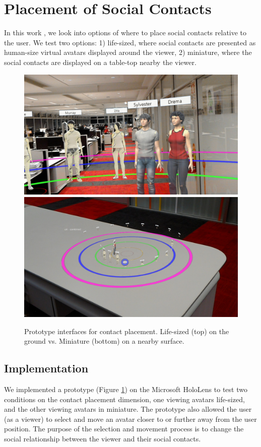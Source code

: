 \section{Placement of Social Contacts}
\label{sec:contacts:placing}

In this work \cite{Nassani2017a}, we look into options of where to place social contacts relative to the user. We test two options: 1) life-sized, where social contacts are presented as human-size virtual avatars displayed around the viewer, 2) miniature, where the social contacts are displayed on a table-top nearby the viewer. 

\begin{figure}[h]
    \centering
    \includegraphics[width=.6\linewidth]{images/ismar17/20170625_205203_HoloLens.jpg}    \includegraphics[width=.6\linewidth]{images/ismar17/20170625_205112_HoloLens.jpg}
    \caption{Prototype interfaces for contact placement. Life-sized (top) on the ground vs. Miniature (bottom) on a nearby surface.} 
    \label{fig:continuum:conditions}
\end{figure}

\subsection{Implementation}

We implemented a prototype (Figure \ref{fig:continuum:conditions}) on the Microsoft HoloLens to test two conditions on the contact placement dimension, one viewing avatars life-sized, and the other viewing avatars in miniature. The prototype also allowed the user (as a viewer) to select and move an avatar closer to or further away from the user position. The purpose of the selection and movement process is to change the social relationship between the viewer and their social contacts. 

